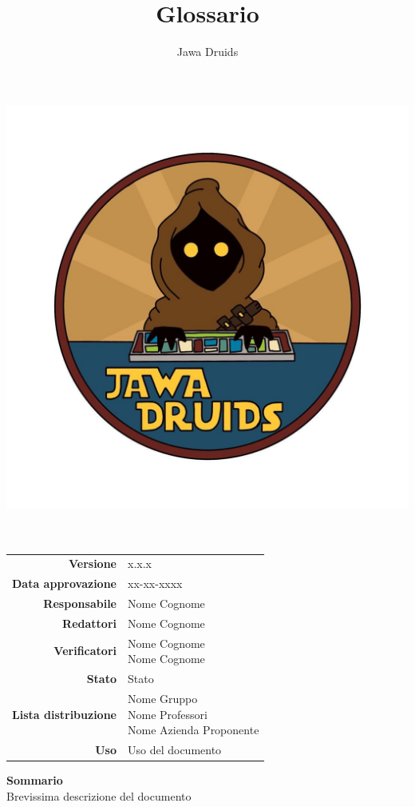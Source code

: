 



	
	\makeatletter
	\begin{titlepage}
		\begin{center}
			\vspace*{-5cm}
			\author{Jawa Druids} 
			\title{Glossario}
			\date{} %
			\includegraphics[width=0.5\linewidth]{../immagini/DRUIDSLOGO.jpg}\\[4ex]
			{\huge \bfseries  \@title }\\[2ex] 
			{\LARGE  \@author}\\[50ex]
			\vspace*{-9cm}
			\begin{table}[H]
				\renewcommand{\arraystretch}{1.4}
				\centering
				\begin{tabular}{r | l}
					\textbf{Versione} & x.x.x \\%
					\textbf{Data approvazione} & xx-xx-xxxx\\
					\textbf{Responsabile} & Nome Cognome\\
					\textbf{Redattori} & Nome Cognome \\
					\textbf{Verificatori} & \makecell[tl]{Nome Cognome \\ Nome Cognome} \\
					\textbf{Stato} & Stato\\
					\textbf{Lista distribuzione} & \makecell[tl]{Nome Gruppo \\ Nome Professori \\ Nome Azienda Proponente}\\
					\textbf{Uso} & Uso del documento            
				\end{tabular}
			\end{table}
			\vspace{0.1cm}
			\hfill \break
			\fontsize{17}{10}\textbf{Sommario} \\
			\vspace{0.1cm}
			Brevissima descrizione del documento 
		\end{center}
	\end{titlepage}
	\makeatother

